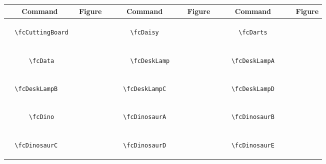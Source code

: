 \documentclass[x11names]{article}
\begin{document}
\begin{table}[H]\centering\begin{tabular}{|c|c|c|c|c|c|}\hline{\bf Command} & {\bf Figure} & {\bf Command} & {\bf Figure} & {\bf Command} & {\bf Figure}\\	\hline	&\multirow{5}{*}{	\fcCuttingBoard	[scale=0.4]} & &\multirow{5}{*}{	\fcDaisy	[scale=0.4]} & &\multirow{5}{*}{	\fcDarts	[scale=0.4]}\\	& & & & & \\	& & & & & \\	\verb|	\fcCuttingBoard	| & & \verb|	\fcDaisy	| & & \verb|	\fcDarts	| & \\	& & & & & \\	& & & & & \\	& & & & & \\	\hline									
		&\multirow{5}{*}{	\fcData	[scale=0.4]} & &\multirow{5}{*}{	\fcDeskLamp	[scale=0.4]} & &\multirow{5}{*}{	\fcDeskLampA	[scale=0.4]}\\	& & & & & \\	& & & & & \\	\verb|	\fcData	| & & \verb|	\fcDeskLamp	| & & \verb|	\fcDeskLampA	| & \\	& & & & & \\	& & & & & \\	& & & & & \\	\hline									
		&\multirow{5}{*}{	\fcDeskLampB	[scale=0.4]} & &\multirow{5}{*}{	\fcDeskLampC	[scale=0.4]} & &\multirow{5}{*}{	\fcDeskLampD	[scale=0.4]}\\	& & & & & \\	& & & & & \\	\verb|	\fcDeskLampB	| & & \verb|	\fcDeskLampC	| & & \verb|	\fcDeskLampD	| & \\	& & & & & \\	& & & & & \\	& & & & & \\	\hline									
		&\multirow{5}{*}{	\fcDino	[scale=0.8]} & &\multirow{5}{*}{	\fcDinosaurA	[scale=0.3]} & &\multirow{5}{*}{	\fcDinosaurB	[scale=0.3]}\\	& & & & & \\	& & & & & \\	\verb|	\fcDino	| & & \verb|	\fcDinosaurA	| & & \verb|	\fcDinosaurB	| & \\	& & & & & \\	& & & & & \\	& & & & & \\	\hline									
		&\multirow{5}{*}{	\fcDinosaurC	[scale=0.3]} & &\multirow{5}{*}{	\fcDinosaurD	[scale=0.3]} & &\multirow{5}{*}{	\fcDinosaurE	[scale=0.3]}\\	& & & & & \\	& & & & & \\	\verb|	\fcDinosaurC	| & & \verb|	\fcDinosaurD	| & & \verb|	\fcDinosaurE	| & \\	& & & & & \\	& & & & & \\	& & & & & \\	\hline									

\end{tabular}
\end{table}
\end{document}
